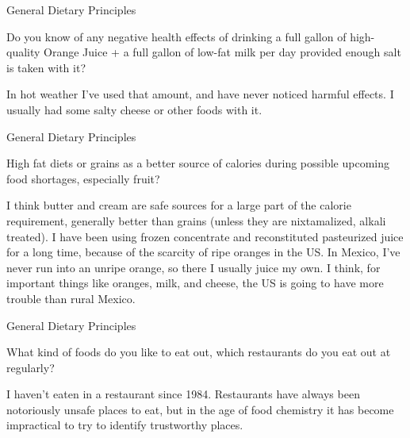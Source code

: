 \documentclass[11pt,oneside,openany,extrafontsizes]{memoir}
\begin{document}
\begin{qaexchange}{General Dietary Principles}

    \begin{question}
        Do you know of any negative health effects of drinking a full gallon of high-quality Orange Juice + a full gallon of low-fat milk per day provided enough salt is taken with it?
    \end{question}

    \begin{answer}
      In hot weather I've used that amount, and have never noticed harmful effects. I usually had some salty cheese or other foods with it.
    \end{answer}
\end{qaexchange}

\begin{qaexchange}{General Dietary Principles}

    \begin{question}
        High fat diets or grains as a better source of calories during possible upcoming food shortages, especially fruit?
    \end{question}

    \begin{answer}
      I think butter and cream are safe sources for a large part of the calorie requirement, generally better than grains (unless they are nixtamalized, alkali treated). I have been using frozen concentrate and reconstituted pasteurized juice for a long time, because of the scarcity of ripe oranges in the US. In Mexico, I've never run into an unripe orange, so there I usually juice my own. I think, for important things like oranges, milk, and cheese, the US is going to have more trouble than rural Mexico.
    \end{answer}
\end{qaexchange}

\begin{qaexchange}{General Dietary Principles}

    \begin{question}
        What kind of foods do you like to eat out, which restaurants do you eat out at regularly?
    \end{question}

    \begin{answer}
      I haven't eaten in a restaurant since 1984. Restaurants have always been notoriously unsafe places to eat, but in the age of food chemistry it has become impractical to try to identify trustworthy places.
    \end{answer}
\end{qaexchange}
\end{document}
